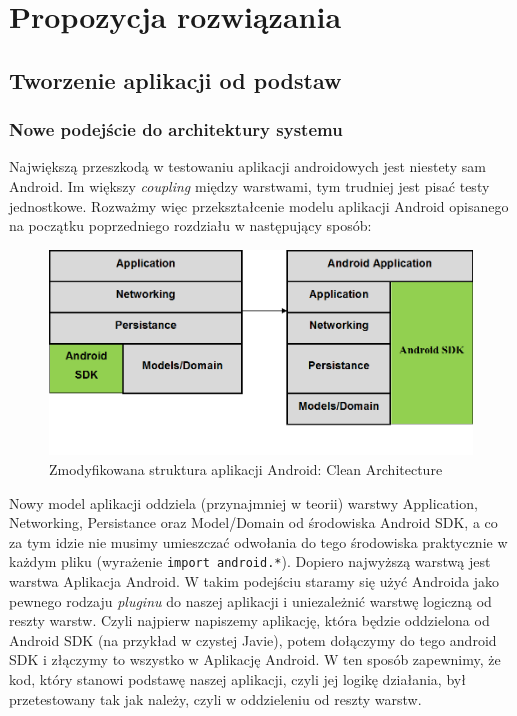 \chapter{Propozycja rozwiązania}

\section{Tworzenie aplikacji od podstaw}
\label{nowa_aplikacja}
\subsection{Nowe podejście do architektury systemu}
\label{clean_architecture}
Największą przeszkodą w testowaniu aplikacji androidowych jest niestety sam Android. Im większy \textit{coupling} między warstwami, tym trudniej jest pisać testy jednostkowe. Rozważmy więc przekształcenie modelu aplikacji Android opisanego na początku poprzedniego rozdziału w następujący sposób:

\begin{figure}[!htb]
    \centering
    \includegraphics[width=13cm]{imgs/ch4_opis_rozwiazania_1.png}
    \caption
{Zmodyfikowana struktura aplikacji Android: Clean Architecture}
    \label{fig:opis_rozwiazania}
\end{figure} 

Nowy model aplikacji oddziela (przynajmniej w teorii) warstwy Application, Networking, Persistance oraz Model/Domain od środowiska Android SDK, a co za tym idzie nie musimy umieszczać odwołania do tego środowiska praktycznie w każdym pliku (wyrażenie \texttt{import android.*}). Dopiero najwyższą warstwą jest warstwa Aplikacja Android. W takim podejściu staramy się użyć Androida jako pewnego rodzaju \textit{pluginu} do naszej aplikacji i uniezależnić warstwę logiczną od reszty warstw. Czyli najpierw napiszemy aplikację, która będzie oddzielona od Android SDK (na przykład w czystej Javie), potem dołączymy do tego android SDK i złączymy to wszystko w Aplikację Android. W ten sposób zapewnimy, że kod, który stanowi podstawę naszej aplikacji, czyli jej logikę działania, był przetestowany tak jak należy, czyli w oddzieleniu od reszty warstw.

